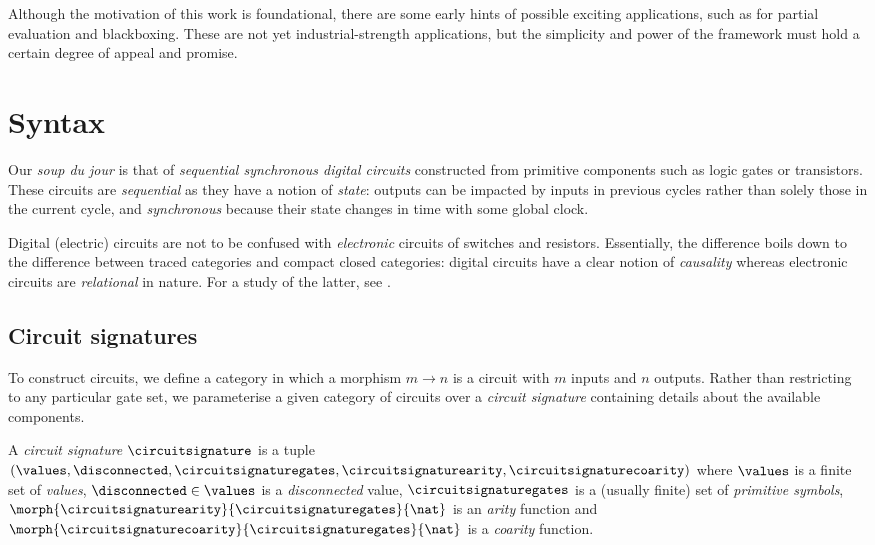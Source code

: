 \documentclass{lmcs}
\begin{document}
Although the motivation of this work is foundational, there are some early
hints of possible exciting applications, such as for partial evaluation and
blackboxing.
These are not yet industrial-strength applications, but the simplicity and
power of the framework must hold a certain degree of appeal and promise.

\section{Syntax}

Our \emph{soup du jour} is that of
\emph{sequential synchronous digital circuits}
constructed from primitive components such as logic gates or transistors.
These circuits are \emph{sequential} as they have a notion of \emph{state}:
outputs can be impacted by inputs in previous cycles rather than solely those in
the current cycle, and \emph{synchronous} because their state changes in time
with some global clock.

\begin{rem}
    Digital (electric) circuits are not to be confused with \emph{electronic}
    circuits of switches and resistors.
    Essentially, the difference boils down to the difference between traced
    categories and compact closed categories: digital circuits have a clear
    notion of \emph{causality} whereas electronic circuits are \emph{relational}
    in nature.
    For a study of the latter, see \cite{boisseau2022string}.
\end{rem}

\subsection{Circuit signatures}

To construct circuits, we define a category in which a morphism
\(m \to n\) is a circuit with \(m\) inputs and \(n\) outputs.
Rather than restricting to any particular gate set, we parameterise a given
category of circuits over a \emph{circuit signature} containing details about
the available components.

\begin{defi}
    A \emph{circuit signature} \(\circuitsignature\) is a tuple \((
    \values,
    \disconnected,
    \circuitsignaturegates,
    \circuitsignaturearity,
    \circuitsignaturecoarity
    )\) where \(\values\) is a finite set of \emph{values}, \(
    \disconnected \in \values
    \) is a \emph{disconnected} value, \(\circuitsignaturegates\) is a (usually
    finite) set of \emph{primitive symbols}, \(
    \morph{\circuitsignaturearity}{\circuitsignaturegates}{\nat}
    \) is an \emph{arity} function and \(
    \morph{\circuitsignaturecoarity}{\circuitsignaturegates}{\nat}
    \) is a \emph{coarity} function.
\end{defi}
\end{document}
